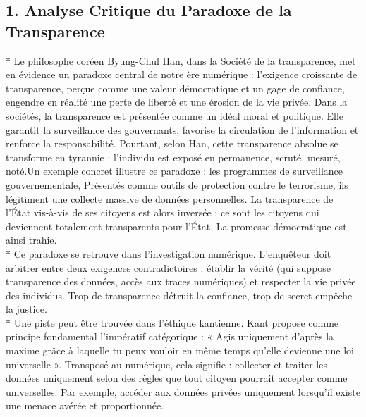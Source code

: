 \documentclass[12pt,a4paper]{article}
\begin{document}
	\subsection*{1. Analyse Critique du Paradoxe de la Transparence}
	* Le philosophe coréen Byung-Chul Han, dans la Société de la transparence, met en évidence un paradoxe central de notre ère numérique : l’exigence croissante de transparence, perçue comme une valeur démocratique et un gage de confiance, engendre en réalité une perte de liberté et une érosion de la vie privée.
	 Dans la sociétés, la transparence est présentée comme un idéal moral et politique. Elle garantit la surveillance des gouvernants, favorise la circulation de l’information et renforce la responsabilité. Pourtant, selon Han, cette transparence absolue se transforme en tyrannie : l’individu est exposé en permanence, scruté, mesuré, noté.Un exemple concret illustre ce paradoxe : les programmes de surveillance gouvernementale, Présentés comme outils de protection contre le terrorisme, ils légitiment une collecte massive de données personnelles. La transparence de l’État vis-à-vis de ses citoyens est alors inversée : ce sont les citoyens qui deviennent totalement transparents pour l’État. La promesse démocratique est ainsi trahie.\\[0.5cm]
	 * Ce paradoxe se retrouve dans l’investigation numérique. L’enquêteur doit arbitrer entre deux exigences contradictoires : établir la vérité (qui suppose transparence des données, accès aux traces numériques) et respecter la vie privée des individus. Trop de transparence détruit la confiance, trop de secret empêche la justice.\\[0.5cm]
	 * Une piste peut être trouvée dans l’éthique kantienne. Kant propose comme principe fondamental l’impératif catégorique : « Agis uniquement d’après la maxime grâce à laquelle tu peux vouloir en même temps qu’elle devienne une loi universelle ». Transposé au numérique, cela signifie : collecter et traiter les données uniquement selon des règles que tout citoyen pourrait accepter comme universelles. Par exemple, accéder aux données privées uniquement lorsqu’il existe une menace avérée et proportionnée.\\[0.1cm]
\end{document}
